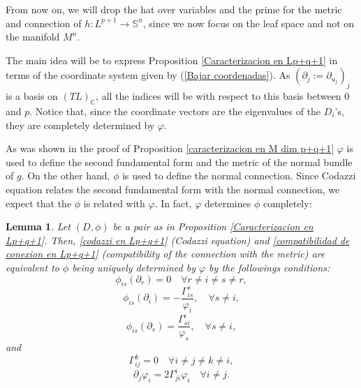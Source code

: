\documentclass{article}
\newtheorem{lema}[thm]{Lemma}
\theoremstyle{remark}
\begin{document}
From now on, we will drop the hat over variables and the prime for the metric and connection of $h:L^{p+1}\rightarrow\mathbb{S}^n$, since we now focus on the leaf space and not on the manifold $M^n$.

The main idea will be to express Proposition \ref{Caracterizacion en Lp+q+1} in terms of the coordinate system given by (\ref{Bajar coordenadas}). As $(\partial_j:=\partial_{u_j})_j$ is a basis on $(TL)_\mathbb{C}$, all the indices will be with respect to this basis between $0$ and $p$. Notice that, since the coordinate vectors are the eigenvalues of the $D_i$'s, they are completely determined by $\varphi$. 

As was shown in the proof of Proposition \ref{caracterizacion en M dim p+q+1} $\varphi$ is used to define the second fundamental form and the metric of the normal bundle of $g$. On the other hand, $\phi$ is used to define the normal connection. Since Codazzi equation relates the second fundamental form with the normal connection, we expect that the $\phi$ is related with $\varphi$. In fact, $\varphi$ determines $\phi$ completely:
\begin{lema}\label{derivadas de phi, Gammas=0, integrabilidad}
    Let $(D,\phi)$ be a pair as in Proposition \ref{Caracterizacion en Lp+q+1}. Then, \ref{codazzi en Lp+q+1} (Codazzi equation) and \ref{compatibilidad de conexion en Lp+q+1} (compatibility of the connection with the metric) are equivalent to $\phi$ being uniquely determined by $\varphi$ by the followings conditions:
    \begin{equation}\label{phi_is(r) para r distinto de i y distinto de s}
        \phi_{is}(\partial_r)=0 \quad\forall r\neq i\neq s\neq r,
    \end{equation}
    \begin{equation}\label{phi_is(i)}
        \phi_{is}(\partial_i)=-\frac{\Gamma_{is}^s}{\varphi_i},\quad\forall s\neq i,
    \end{equation}
    \begin{equation}\label{phi_is(s)}
        \phi_{is}(\partial_s)=\frac{\Gamma_{si}^i}{\varphi_s},\quad\forall s\neq i,
    \end{equation}
    and
    \begin{equation}\label{Gamma es cero si tres son diferentes en p+1}
        \Gamma^k_{ij}=0 \quad\forall i\neq j\neq k\neq i,
    \end{equation}
    \begin{equation}\label{derivadas de phi_i caso p+1}
        \partial_j\varphi_i=2\Gamma^i_{ji}\varphi_i\quad\forall  i\neq j.
    \end{equation}
\end{lema}
\end{document}
